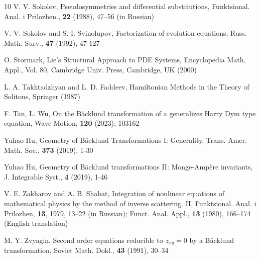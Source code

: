 \documentclass[12pt,english]{elsarticle}
\theoremstyle{plain}
\theoremstyle{plain}
\theoremstyle{remark}
\theoremstyle{plain}
\theoremstyle{definition}
\theoremstyle{definition}
\begin{document}
\begin{thebibliography}{10}
V. V. Sokolov, Pseudosymmetries and differential
substitutions, Funktsional. Anal. i Prilozhen., \textbf{22} (1988),
47--56 (in Russian)

V. V. Sokolov and S. I. Svinolupov, Factorization
of evolution equations, Russ. Math. Surv., \textbf{47} (1992), 47-127

O. Stormark, Lie’s Structural Approach to PDE Systems,
Encyclopedia Math. Appl., Vol. 80, Cambridge Univ. Press, Cambridge,
UK (2000)

L. A. Takhtadzhyan and L. D. Faddeev, Hamiltonian
Methods in the Theory of Solitons, Springer (1987)

F. Tan, L. Wu, On the Bäcklund transformation of a
generalizes Harry Dym type equation, Wave Motion, \textbf{120} (2023),
103162

Yuhao Hu, Geometry of Bäcklund Transformations I:
Generality, Trans. Amer. Math. Soc., \textbf{373} (2019), 1-30

Yuhao Hu, Geometry of Bäcklund transformations II:
Monge-Ampère invariants, J. Integrable Syst., \textbf{4} (2019), 1-46

V. E. Zakharov and A. B. Shabat, Integration of
nonlinear equations of mathematical physics by the method of inverse
scattering. II, Funktsional. Anal. i Prilozhen, \textbf{13}, 1979,
13--22 (in Russian); Funct. Anal. Appl., \textbf{13} (1980), 166--174
(English translation)

M. Y. Zvyagin, Second order equations reducible
to $z_{xy}=0$ by a Bäcklund transformation, Soviet Math. Dokl., \textbf{43}
(1991), 30--34

\end{thebibliography}
\end{document}
